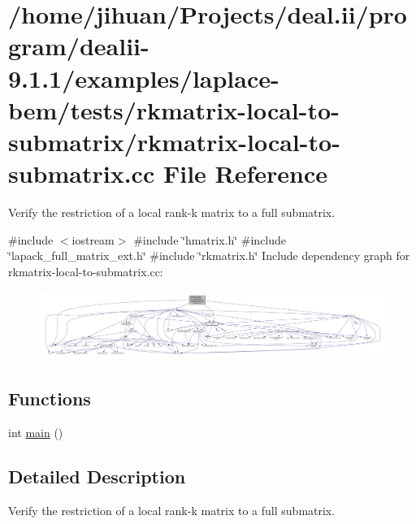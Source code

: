 \hypertarget{rkmatrix-local-to-submatrix_8cc}{}\section{/home/jihuan/\+Projects/deal.ii/program/dealii-\/9.1.1/examples/laplace-\/bem/tests/rkmatrix-\/local-\/to-\/submatrix/rkmatrix-\/local-\/to-\/submatrix.cc File Reference}
\label{rkmatrix-local-to-submatrix_8cc}


Verify the restriction of a local rank-\/k matrix to a full submatrix.  


{\ttfamily \#include $<$iostream$>$}\newline
{\ttfamily \#include \char`\"{}hmatrix.\+h\char`\"{}}\newline
{\ttfamily \#include \char`\"{}lapack\+\_\+full\+\_\+matrix\+\_\+ext.\+h\char`\"{}}\newline
{\ttfamily \#include \char`\"{}rkmatrix.\+h\char`\"{}}\newline
Include dependency graph for rkmatrix-\/local-\/to-\/submatrix.cc\+:\nopagebreak
\begin{figure}[H]
\begin{center}
\leavevmode
\includegraphics[width=350pt]{rkmatrix-local-to-submatrix_8cc__incl}
\end{center}
\end{figure}
\subsection*{Functions}
\begin{DoxyCompactItemize}
\item 
int \hyperlink{rkmatrix-local-to-submatrix_8cc_ae66f6b31b5ad750f1fe042a706a4e3d4}{main} ()
\end{DoxyCompactItemize}


\subsection{Detailed Description}
Verify the restriction of a local rank-\/k matrix to a full submatrix. 

